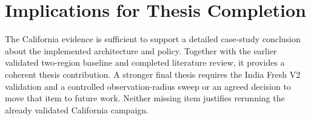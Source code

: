 \section{Implications for Thesis Completion}

The California evidence is sufficient to support a detailed case-study conclusion about the implemented architecture and policy. Together with the earlier validated two-region baseline and completed literature review, it provides a coherent thesis contribution. A stronger final thesis requires the India Fresh V2 validation and a controlled observation-radius sweep or an agreed decision to move that item to future work. Neither missing item justifies rerunning the already validated California campaign.

